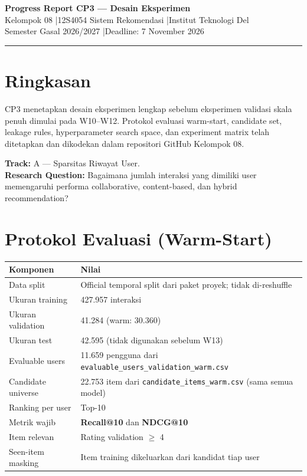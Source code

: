 \documentclass[10pt,a4paper]{article}
\begin{document}
\begin{center}
  {\Large\bfseries Progress Report CP3 --- Desain Eksperimen}\\[4pt]
  {\normalsize Kelompok 08 \quad|\quad 12S4054 Sistem Rekomendasi \quad|\quad Institut Teknologi Del}\\
  {\small Semester Gasal 2026/2027 \quad|\quad Deadline: 7 November 2026}
\end{center}

\vspace{4pt}\hrule\vspace{8pt}

\section{Ringkasan}

CP3 menetapkan desain eksperimen lengkap sebelum eksperimen validasi skala penuh dimulai pada W10--W12.
Protokol evaluasi warm-start, candidate set, leakage rules, hyperparameter search space, dan experiment
matrix telah ditetapkan dan dikodekan dalam repositori GitHub Kelompok 08.

\textbf{Track:} A --- Sparsitas Riwayat User.\\
\textbf{Research Question:} Bagaimana jumlah interaksi yang dimiliki user memengaruhi performa
collaborative, content-based, dan hybrid recommendation?

\section{Protokol Evaluasi (Warm-Start)}

\begin{table}[h!]
\centering
\begin{tabular}{@{}ll@{}}
\toprule
\textbf{Komponen} & \textbf{Nilai} \\
\midrule
Data split & Official temporal split dari paket proyek; tidak di-reshuffle \\
Ukuran training & 427.957 interaksi \\
Ukuran validation & 41.284 (warm: 30.360) \\
Ukuran test & 42.595 (tidak digunakan sebelum W13) \\
Evaluable users & 11.659 pengguna dari \texttt{evaluable\_users\_validation\_warm.csv} \\
Candidate universe & 22.753 item dari \texttt{candidate\_items\_warm.csv} (sama semua model) \\
Ranking per user & Top-10 \\
Metrik wajib & \textbf{Recall@10} dan \textbf{NDCG@10} \\
Item relevan & Rating validation $\geq$ 4 \\
Seen-item masking & Item training dikeluarkan dari kandidat tiap user \\
\bottomrule
\end{tabular}
\end{table}
\end{document}

